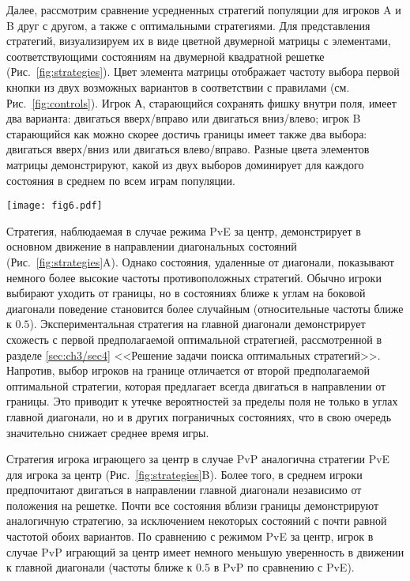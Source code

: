 Далее, рассмотрим сравнение усредненных стратегий популяции для игроков A и B друг с другом, а также с оптимальными стратегиями. 
Для представления стратегий, визуализируем их в виде цветной двумерной матрицы с элементами, 
соответствующими состояниям на двумерной квадратной решетке (Рис.~\cref{fig:strategies}). 
Цвет элемента матрицы отображает частоту выбора первой кнопки из двух возможных вариантов в соответствии с правилами (см. Рис.~\cref{fig:controls}). 
Игрок А, старающийся сохранять фишку внутри поля, имеет два варианта: двигаться вверх/вправо или двигаться вниз/влево; 
игрок B старающийся как можно скорее достичь границы имеет также два выбора: двигаться вверх/вниз или двигаться влево/вправо. 
Разные цвета элементов матрицы демонстрируют, какой из двух выборов доминирует для каждого состояния в среднем по всем играм популяции.

\begin{figure*}[t]
    \centering
    \texttt{[image: fig6.pdf]}
    \caption{
        Визуализация средних популяционных стратегий для разных режимов, полученных в эксперименте. 
        Цвет ячеек отображает частоту выбора первой чистой стратегии: для игры за центр (A, B, C) и для игры за границу (D, E, F).
    }  
    \label{fig:strategies}
    
\end{figure*}

Стратегия, наблюдаемая в случае режима PvE за центр, демонстрирует в основном движение в направлении диагональных состояний (Рис.~\cref{fig:strategies}A). 
Однако состояния, удаленные от диагонали, показывают немного более высокие частоты противоположных стратегий. 
Обычно игроки выбирают уходить от границы, но в состояниях ближе к углам на боковой диагонали поведение становится более случайным 
(относительные частоты ближе к $0.5$). Экспериментальная стратегия на главной диагонали демонстрирует схожесть с первой предполагаемой оптимальной стратегией, 
рассмотренной в разделе \cref{sec:ch3/sec4} <<Решение задачи поиска оптимальных стратегий>>. Напротив, выбор игроков на границе отличается от второй предполагаемой оптимальной стратегии, 
которая предлагает всегда двигаться в направлении от границы. Это приводит к утечке вероятностей за пределы поля не только в углах главной диагонали, 
но и в других пограничных состояниях, что в свою очередь значительно снижает среднее время игры. 

Стратегия игрока играющего за центр в случае PvP аналогична стратегии PvE для игрока за центр (Рис.~\cref{fig:strategies}B). 
Более того, в среднем игроки предпочитают двигаться в направлении главной диагонали независимо от положения на решетке. 
Почти все состояния вблизи границы демонстрируют аналогичную стратегию, за исключением некоторых состояний с почти равной частотой обоих вариантов. 
По сравнению с режимом PvE за центр, игрок в случае PvP играющий за центр имеет немного меньшую уверенность в движении к главной диагонали 
(частоты ближе к $0.5$ в PvP по сравнению с PvE).

